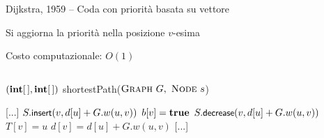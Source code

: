 \begin{frame}{Dijkstra, 1959 -- Coda con priorità basata su vettore}

\vspace{-9pt}
\begin{myboxtitle}
\BI
\item Si aggiorna la priorità nella posizione $v$-esima
\item Costo computazionale: $O(1)$
\EI
\end{myboxtitle}
    
\vspace{-18pt}
\begin{columns}
\small
\begin{Procedure}
\caption[A]{$(\INTARRAY, \INTARRAY)$ \textsf{shortestPath}($\textsc{Graph}\ G,\ \textsc{Node}\ s$)}
[...]\;
    {
      {
        $S.\textsf{{\small insert}}(v, d[u]+G.w(u,v))$\;
        $b[v] = \TRUE$\;
      }
      {
        \alert{$S.\textsf{{\small decrease}}(v, d[u]+G.w(u,v))$}
      }
      $T[v] = u$\;
      $d[v] = d[u] + G.w(u,v)$\;
    }
[...]\;
\end{Procedure}
\end{columns}

\end{frame}

